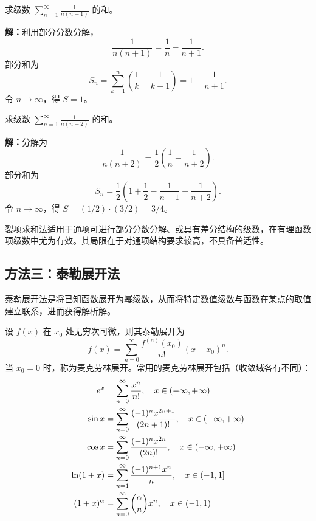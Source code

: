 \begin{example}[有理分式裂项]
求级数 $\displaystyle\sum_{n=1}^{\infty} \frac{1}{n(n+1)}$ 的和。

\textbf{解：}利用部分分数分解，
\begin{equation}
\frac{1}{n(n+1)} = \frac{1}{n} - \frac{1}{n+1}.
\end{equation}
部分和为
\begin{equation}
S_n = \sum_{k=1}^{n}\left(\frac{1}{k} - \frac{1}{k+1}\right) = 1 - \frac{1}{n+1}.
\end{equation}
令 $n \to \infty$，得 $S = 1$。
\end{example}

\begin{example}[含平方的裂项]
求级数 $\displaystyle\sum_{n=1}^{\infty} \frac{1}{n(n+2)}$ 的和。

\textbf{解：}分解为
\begin{equation}
\frac{1}{n(n+2)} = \frac{1}{2}\left(\frac{1}{n} - \frac{1}{n+2}\right).
\end{equation}
部分和为
\begin{equation}
S_n = \frac{1}{2}\left(1 + \frac{1}{2} - \frac{1}{n+1} - \frac{1}{n+2}\right).
\end{equation}
令 $n \to \infty$，得 $S = (1/2) \cdot (3/2) = 3/4$。
\end{example}

裂项求和法适用于通项可进行部分分数分解、或具有差分结构的级数，在有理函数项级数中尤为有效。其局限在于对通项结构要求较高，不具备普适性。

\subsection{方法三：泰勒展开法}

泰勒展开法是将已知函数展开为幂级数，从而将特定数值级数与函数在某点的取值建立联系，进而获得解析解。

设 $f(x)$ 在 $x_0$ 处无穷次可微，则其泰勒展开为
\begin{equation}
f(x) = \sum_{n=0}^{\infty} \frac{f^{(n)}(x_0)}{n!} (x - x_0)^n.
\end{equation}
当 $x_0 = 0$ 时，称为麦克劳林展开。常用的麦克劳林展开包括（收敛域各有不同）：
\begin{align}
e^x &= \sum_{n=0}^{\infty} \frac{x^n}{n!}, \quad x \in (-\infty, +\infty) \label{eq:exp}\\
\sin x &= \sum_{n=0}^{\infty} \frac{(-1)^n x^{2n+1}}{(2n+1)!}, \quad x \in (-\infty, +\infty) \notag\\
\cos x &= \sum_{n=0}^{\infty} \frac{(-1)^n x^{2n}}{(2n)!}, \quad x \in (-\infty, +\infty) \notag\\
\ln(1+x) &= \sum_{n=1}^{\infty} \frac{(-1)^{n+1} x^n}{n}, \quad x \in (-1, 1] \label{eq:ln}\\
(1+x)^\alpha &= \sum_{n=0}^{\infty} \binom{\alpha}{n} x^n, \quad x \in (-1, 1) \notag
\end{align}

